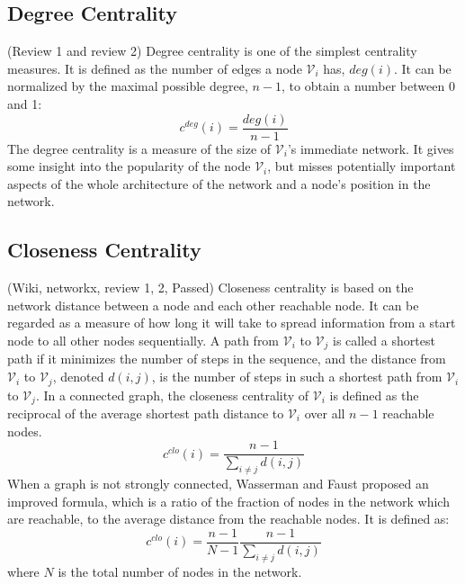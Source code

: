 \documentclass[\main/thesis.tex]{subfiles}
\begin{document}
\subsection{Degree Centrality}
(Review 1 and review 2) Degree centrality is one of the simplest centrality measures. It is defined as the number of edges a node $\mathcal{V}_i$ has, $deg(i)$. It can be normalized by the maximal possible degree, $n-1$, to obtain a number between 0 and 1:
\begin{equation}
c^{deg}(i) = \frac{deg(i)}{n-1}
\end{equation}
The degree centrality is a measure of the size of $\mathcal{V}_i$'s immediate network. It gives some insight into the popularity of the node $\mathcal{V}_i$, but misses potentially important aspects of the whole architecture of the network and a node’s position in the network.
\subsection{Closeness Centrality}
(Wiki, networkx, review 1, 2, Passed) Closeness centrality \cite{freeman1978centrality} is based on the network distance between a node and each other reachable node. It can be regarded as a measure of how long it will take to spread information from a start node to all other nodes sequentially. A path from $\mathcal{V}_i$ to $\mathcal{V}_j$ is called a shortest path if it minimizes the number of steps in the sequence, and the distance from $\mathcal{V}_i$ to $\mathcal{V}_j$, denoted $d(i,j)$, is the number of steps in such a shortest path from $\mathcal{V}_i$ to $\mathcal{V}_j$. In a connected graph, the closeness centrality of $\mathcal{V}_i$ is defined as the reciprocal of the average shortest path distance to $\mathcal{V}_i$ over all $n-1$ reachable nodes.
\begin{equation}
c^{clo}(i) = \frac{n-1}{\sum_{i\neq j}d(i,j)}
\end{equation}
When a graph is not strongly connected, Wasserman and Faust \cite{wasserman1994social} proposed an improved formula, which is a ratio of the fraction of nodes in the network which are reachable, to the average distance from the reachable nodes. It is defined as:
\begin{equation}
c^{clo}(i) = \frac{n-1}{N-1}\frac{n-1}{\sum_{i\neq j}d(i,j)}
\end{equation}
where $N$ is the total number of nodes in the network.
\end{document}
